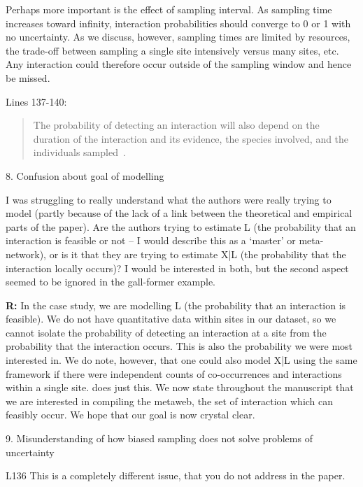 \documentclass[12pt]{letter}
\newenvironment{refquote}{\bigskip \begin{it}}{\end{it}\smallskip}
\begin{document}
		Perhaps more important is the effect of sampling interval. As sampling time increases toward infinity, interaction probabilities should converge to 0 or 1 with no uncertainty. As we discuss, however, sampling times are limited by resources, the trade-off between sampling a single site intensively versus many sites, etc. Any interaction could therefore occur outside of the sampling window and hence be missed.


		Lines 137-140:


		\begin{quotation}
			The probability of detecting an interaction will also depend on the duration of the interaction and its evidence, the species involved, and the individuals sampled~\citep{Wells2013,Lagrue2015,Cirtwill2016,Weinstein2017}. 
		\end{quotation}

	8. Confusion about goal of modelling


		\begin{refquote}
		I was struggling to really understand what the authors were really trying to model (partly because of the lack of a link between the theoretical and empirical parts of the paper). Are the authors trying to estimate L (the probability that an interaction is feasible or not – I would describe this as a `master' or meta- network), or is it that they are trying to estimate X|L (the probability that the interaction locally occurs)? I would be interested in both, but the second aspect seemed to be ignored in the gall-former example.
		\end{refquote}


		\textbf{R:} In the case study, we are modelling L (the probability that an interaction is feasible). We do not have quantitative data within sites in our dataset, so we cannot isolate the probability of detecting an interaction at a site from the probability that the interaction occurs. This is also the probability we were most interested in. We do note, however, that one could also model X|L using the same framework if there were independent counts of co-occurrences and interactions within a single site. \citet{Gravel2018} does just this. We now state throughout the manuscript that we are interested in compiling the metaweb, the set of interaction which can feasibly occur. We hope that our goal is now crystal clear.


	9. Misunderstanding of how biased sampling does not solve problems of uncertainty


		\begin{refquote}
		L136 This is a completely different issue, that you do not address in the paper.
		\end{refquote}
\end{document}

